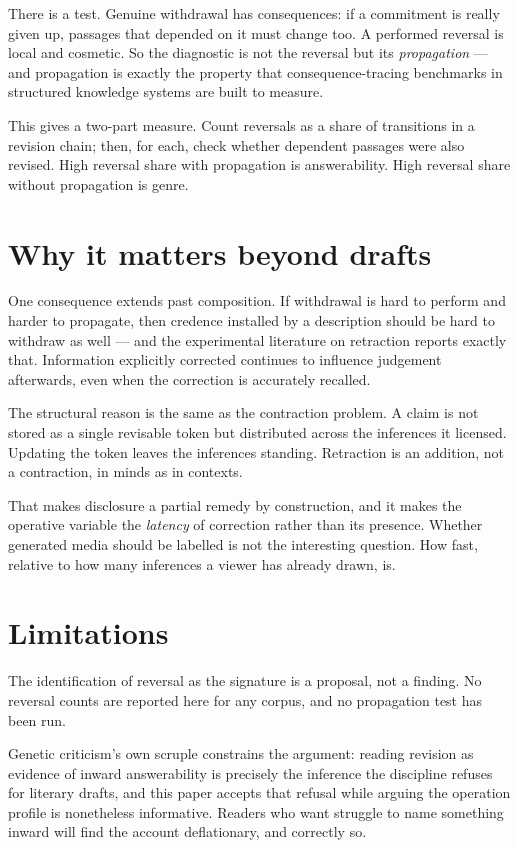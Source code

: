 \documentclass[11pt,a4paper]{article}
\begin{document}
There is a test. Genuine withdrawal has consequences: if a commitment is really given up, passages that depended on it must change too. A performed reversal is local and cosmetic. So the diagnostic is not the reversal but its \emph{propagation} --- and propagation is exactly the property that consequence-tracing benchmarks in structured knowledge systems are built to measure.

This gives a two-part measure. Count reversals as a share of transitions in a revision chain; then, for each, check whether dependent passages were also revised. High reversal share with propagation is answerability. High reversal share without propagation is genre.

\section{Why it matters beyond drafts}
One consequence extends past composition. If withdrawal is hard to perform and harder to propagate, then credence installed by a description should be hard to withdraw as well --- and the experimental literature on retraction reports exactly that. Information explicitly corrected continues to influence judgement afterwards, even when the correction is accurately recalled.

The structural reason is the same as the contraction problem. A claim is not stored as a single revisable token but distributed across the inferences it licensed. Updating the token leaves the inferences standing. Retraction is an addition, not a contraction, in minds as in contexts.

That makes disclosure a partial remedy by construction, and it makes the operative variable the \emph{latency} of correction rather than its presence. Whether generated media should be labelled is not the interesting question. How fast, relative to how many inferences a viewer has already drawn, is.

\section{Limitations}
The identification of reversal as the signature is a proposal, not a finding. No reversal counts are reported here for any corpus, and no propagation test has been run.

Genetic criticism's own scruple constrains the argument: reading revision as evidence of inward answerability is precisely the inference the discipline refuses for literary drafts, and this paper accepts that refusal while arguing the operation profile is nonetheless informative. Readers who want struggle to name something inward will find the account deflationary, and correctly so.
\end{document}

